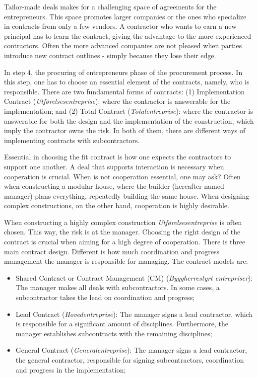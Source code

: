 Tailor-made deals makes for a challenging space of agreements for the entrepreneurs. This space promotes larger companies or the ones who specialize in contracts from only a few vendors. A contractor who wants to earn a new principal has to learn the contract, giving the advantage to the more experienced contractors. Often the more advanced companies are not pleased when parties introduce new contract outlines - simply because they lose their edge. 

In step 4, the procuring of entrepreneurs phase of the procurement process. In this step, one has to choose an essential element of the contracts, namely, who is responsible. There are two fundamental forms of contracts: (1) Implementation Contract (\textit{Utførelsesentreprise}): where the contractor is answerable for the implementation; and (2) Total Contract (\textit{Totalentreprise}): where the contractor is answerable for both the design and the implementation of the construction, which imply the contractor owns the risk. In both of them, there are different ways of implementing contracts with subcontractors. 

Essential in choosing the fit contract is how one expects the contractors to support one another. A deal that supports interaction is necessary when cooperation is crucial. When is not cooperation essential, one may ask? Often when constructing a modular house, where the builder (hereafter named manager) plans everything, repeatedly building the same house. When designing complex constructions, on the other hand, cooperation is highly desirable. 

When constructing a highly complex construction \textit{Utførelsesentreprise} is often chosen. This way, the risk is at the manager. Choosing the right design of the contract is crucial when aiming for a high degree of cooperation. There is three main contract design. Different is how much coordination and progress management the manager is responsible for managing. The contract models are: 

\begin{itemize}
    \item Shared Contract or Contract Management (CM) (\textit{Byggherrestyrt entrepriser}): The manager makes all deals with subcontractors. In some cases, a subcontractor takes the lead on coordination and progress;
    \item Lead Contract (\textit{Hovedentreprise}): The manager signs a lead contractor, which is responsible for a significant amount of disciplines. Furthermore, the manager establishes subcontracts with the remaining disciplines; 
    \item General Contract (\textit{Generalentreprise}): The manager signs a lead contractor, the general contractor, responsible for signing subcontractors, coordination and progress in the implementation;
\end{itemize}

